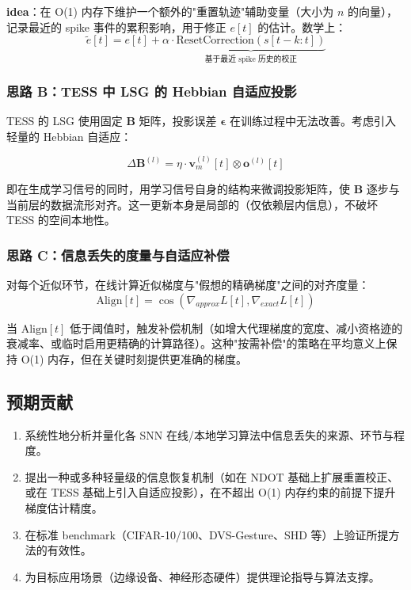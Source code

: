 \documentclass[journal,12pt,onecolumn]{IEEEtran}
\begin{document}
\textbf{idea}：在 O(1) 内存下维护一个额外的"重置轨迹"辅助变量（大小为 $n$ 的向量），记录最近的 spike 事件的累积影响，用于修正 $e[t]$ 的估计。数学上：
\begin{equation}
\tilde{e}[t] = e[t] + \alpha \cdot \underbrace{\text{ResetCorrection}(s[t-k:t])}_{\text{基于最近 spike 历史的校正}}
\label{eq.extended_e}
\end{equation}

\subsubsection{思路 B：TESS 中 LSG 的 Hebbian 自适应投影}

TESS 的 LSG 使用固定 $\mathbf{B}$ 矩阵，投影误差 $\boldsymbol{\epsilon}$ 在训练过程中无法改善。考虑引入轻量的 Hebbian 自适应：

\begin{equation}
\Delta \mathbf{B}^{(l)} = \eta \cdot \mathbf{v}_m^{(l)}[t] \otimes \mathbf{o}^{(l)}[t]
\label{eq.hebbian_B}
\end{equation}

即在生成学习信号的同时，用学习信号自身的结构来微调投影矩阵，使 $\mathbf{B}$ 逐步与当前层的数据流形对齐。这一更新本身是局部的（仅依赖层内信息），不破坏 TESS 的空间本地性。

\subsubsection{思路 C：信息丢失的度量与自适应补偿}

对每个近似环节，在线计算近似梯度与"假想的精确梯度"之间的对齐度量：
\begin{equation}
\text{Align}[t] = \cos(\nabla_{approx}L[t], \nabla_{exact}L[t])
\label{eq.align}
\end{equation}

当 $\text{Align}[t]$ 低于阈值时，触发补偿机制（如增大代理梯度的宽度、减小资格迹的衰减率、或临时启用更精确的计算路径）。这种"按需补偿"的策略在平均意义上保持 O(1) 内存，但在关键时刻提供更准确的梯度。

\subsection{预期贡献}

\begin{enumerate}
    \item 系统性地分析并量化各 SNN 在线/本地学习算法中信息丢失的来源、环节与程度。
    \item 提出一种或多种轻量级的信息恢复机制（如在 NDOT 基础上扩展重置校正、或在 TESS 基础上引入自适应投影），在不超出 O(1) 内存约束的前提下提升梯度估计精度。
    \item 在标准 benchmark（CIFAR-10/100、DVS-Gesture、SHD 等）上验证所提方法的有效性。
    \item 为目标应用场景（边缘设备、神经形态硬件）提供理论指导与算法支撑。
\end{enumerate}
\end{document}
